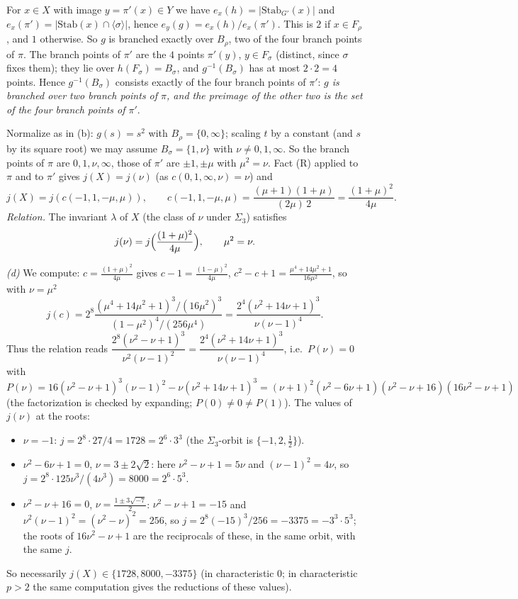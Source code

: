 \documentclass[11pt]{article}
\begin{document}
For $x\in X$ with image $y=\pi'(x)\in Y$ we have $e_x(h)=|\mathrm{Stab}_{G'}(x)|$ and $e_x(\pi')=|\mathrm{Stab}(x)\cap\langle\sigma\rangle|$, hence $e_y(g)=e_x(h)/e_x(\pi')$. This is $2$ if $x\in F_\rho$, and $1$ otherwise. So $g$ is branched exactly over $B_\rho$, two of the four branch points of $\pi$. The branch points of $\pi'$ are the $4$ points $\pi'(y)$, $y\in F_\sigma$ (distinct, since $\sigma$ fixes them); they lie over $h(F_\sigma)=B_\sigma$, and $g^{-1}(B_\sigma)$ has at most $2\cdot2=4$ points. Hence $g^{-1}(B_\sigma)$ consists exactly of the four branch points of $\pi'$: \emph{$g$ is branched over two branch points of $\pi$, and the preimage of the other two is the set of the four branch points of $\pi'$}.

Normalize as in (b): $g(s)=s^2$ with $B_\rho=\{0,\infty\}$; scaling $t$ by a constant (and $s$ by its square root) we may assume $B_\sigma=\{1,\nu\}$ with $\nu\ne0,1,\infty$. So the branch points of $\pi$ are $0,1,\nu,\infty$, those of $\pi'$ are $\pm1,\pm\mu$ with $\mu^2=\nu$. Fact (R) applied to $\pi$ and to $\pi'$ gives $j(X)=j(\nu)$ (as $c(0,1,\infty,\nu)=\nu$) and
\[ j(X)=j(c(-1,1,-\mu,\mu)),\qquad c(-1,1,-\mu,\mu)=\frac{(\mu+1)(1+\mu)}{(2\mu)\,2}=\frac{(1+\mu)^2}{4\mu}. \]
\emph{Relation.} The invariant $\lambda$ of $X$ (the class of $\nu$ under $\Sigma_3$) satisfies
\[ j(\nu)=j\Bigl(\frac{(1+\mu)^2}{4\mu}\Bigr),\qquad \mu^2=\nu. \]

\emph{(d)} We compute: $c=\frac{(1+\mu)^2}{4\mu}$ gives $c-1=\frac{(1-\mu)^2}{4\mu}$, $c^2-c+1=\frac{\mu^4+14\mu^2+1}{16\mu^2}$, so with $\nu=\mu^2$
\[ j(c)=2^8\frac{(\mu^4+14\mu^2+1)^3/(16\mu^2)^3}{(1-\mu^2)^4/(256\mu^4)}=\frac{2^4(\nu^2+14\nu+1)^3}{\nu(\nu-1)^4}. \]
Thus the relation reads $\dfrac{2^8(\nu^2-\nu+1)^3}{\nu^2(\nu-1)^2}=\dfrac{2^4(\nu^2+14\nu+1)^3}{\nu(\nu-1)^4}$, i.e.\ $P(\nu)=0$ with
\[ P(\nu)=16(\nu^2-\nu+1)^3(\nu-1)^2-\nu(\nu^2+14\nu+1)^3=(\nu+1)^2(\nu^2-6\nu+1)(\nu^2-\nu+16)(16\nu^2-\nu+1) \]
(the factorization is checked by expanding; $P(0)\ne0\ne P(1)$). The values of $j(\nu)$ at the roots:
\begin{itemize}
\item $\nu=-1$: $j=2^8\cdot27/4=1728=2^6\cdot3^3$ (the $\Sigma_3$-orbit is $\{-1,2,\tfrac12\}$).
\item $\nu^2-6\nu+1=0$, $\nu=3\pm2\sqrt2$: here $\nu^2-\nu+1=5\nu$ and $(\nu-1)^2=4\nu$, so $j=2^8\cdot125\nu^3/(4\nu^3)=8000=2^6\cdot5^3$.
\item $\nu^2-\nu+16=0$, $\nu=\frac{1\pm3\sqrt{-7}}2$: $\nu^2-\nu+1=-15$ and $\nu^2(\nu-1)^2=(\nu^2-\nu)^2=256$, so $j=2^8(-15)^3/256=-3375=-3^3\cdot5^3$; the roots of $16\nu^2-\nu+1$ are the reciprocals of these, in the same orbit, with the same $j$.
\end{itemize}
So necessarily $j(X)\in\{1728,8000,-3375\}$ (in characteristic $0$; in characteristic $p>2$ the same computation gives the reductions of these values).
\end{document}
